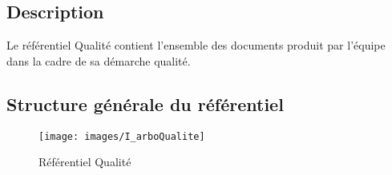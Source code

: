 \subsection{Description}

Le référentiel Qualité contient l'ensemble des documents produit par l'équipe \nomEquipe{}
dans la cadre de sa démarche qualité.

\subsection{Structure générale du référentiel}\label{ref_qualite}



\begin{figure}[ht]
         \begin{center}
         \texttt{[image: images/I\_arboQualite]}
         \end{center}
         \caption{Référentiel Qualité}
 \end{figure}
 
\clearpage



